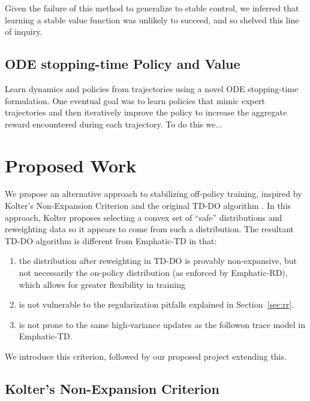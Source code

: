 \documentclass[11pt]{article}
\begin{document}
Given the failure of this method to generalize to stable control, we inferred that learning a stable value function was unlikely to succeed, and so shelved this line of inquiry.

\subsection{ODE stopping-time Policy and Value}

Learn dynamics and policies from trajectories using a novel ODE stopping-time formulation. One eventual goal was to learn policies that mimic expert trajectories and then iteratively improve the policy to increase the aggregate reward encountered during each trajectory. To do this we...

\section{Proposed Work}
We propose an alternative approach to stabilizing off-policy training, inspired by Kolter's Non-Expansion Criterion and the original TD-DO algorithm \cite{kolter2011fixed}. 
In this approach, Kolter proposes selecting a convex set of ``safe'' distributions and reweighting data so it appears to come from such a distribution. The resultant TD-DO algorithm is different from Emphatic-TD in that:
\begin{enumerate}
  \item the distribution after reweighting in TD-DO is provably non-expansive, but not necessarily the on-policy distribution (as enforced by Emphatic-RD), which allows for greater flexibility in training
  \item is not vulnerable to the regularization pitfalls explained in Section~\ref{sec:rr}.
  \item is not prone to the same high-variance updates as the followon trace model in Emphatic-TD.
\end{enumerate}
We introduce this criterion, followed by our proposed project extending this.

\subsection{Kolter's Non-Expansion Criterion }
\end{document}
